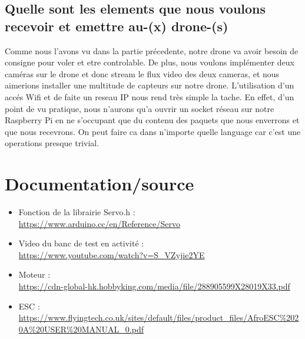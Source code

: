 \documentclass[10pt,a4paper]{article}
\begin{document}
\subsection{Quelle sont les elements que nous voulons recevoir et emettre au-(x) drone-(s)}
Comme nous l'avons vu dans la partie précedente, notre drone va avoir besoin de consigne pour voler et etre controlable. De plus, nous voulons implémenter deux caméras sur le drone et donc stream le flux video des deux cameras, et nous aimerions installer une multitude de capteurs sur notre drone. L'utilisation d'un accés Wifi et de faite un reseau IP nous rend très simple la tache. En effet, d'un point de vu pratique, nous n'aurons qu'a ouvrir un socket réseau sur notre Raspberry Pi en ne s'occupant que du contenu des paquets que nous enverrons et que nous recevrons. On peut faire ca dans n'importe quelle language car c'est une operations presque trivial. 




\section*{Documentation/source}
\begin{itemize}
 \item Fonction de la librairie Servo.h :\\
\url{https://www.arduino.cc/en/Reference/Servo}
\item Video du banc de test en activité : \\
\url{https://www.youtube.com/watch?v=S_VZyjie2YE}
\item Moteur : \\
\url{https://cdn-global-hk.hobbyking.com/media/file/288905599X28019X33.pdf}
\item ESC :\\
\url{https://www.flyingtech.co.uk/sites/default/files/product_files/AfroESC\%2020A\%20USER\%20MANUAL\_0.pdf}
\end{itemize}
\end{document}
